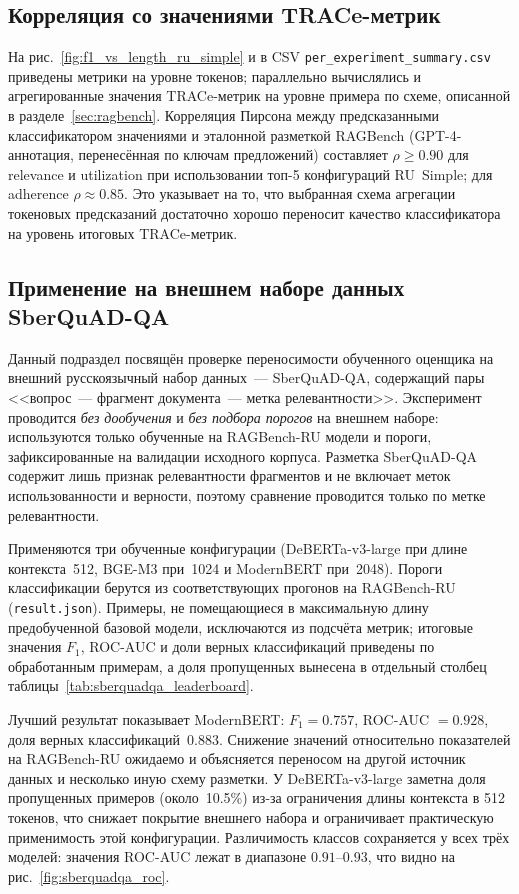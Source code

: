 \subsection{Корреляция со значениями TRACe-метрик}

На рис.~\ref{fig:f1_vs_length_ru_simple} и в CSV \texttt{per\_experiment\_summary.csv}
приведены метрики на уровне токенов; параллельно вычислялись и агрегированные
значения TRACe-метрик на уровне примера по схеме, описанной в разделе~\ref{sec:ragbench}. Корреляция Пирсона между
предсказанными классификатором значениями и эталонной разметкой RAGBench (GPT-4-аннотация, перенесённая по ключам предложений) составляет
$\rho \ge 0.90$ для relevance и utilization при использовании топ-5 конфигураций
RU~Simple; для adherence $\rho \approx 0.85$. Это указывает на то, что выбранная схема
агрегации токеновых предсказаний достаточно хорошо переносит качество классификатора на
уровень итоговых TRACe-метрик.

\subsection{Применение на внешнем наборе данных SberQuAD-QA}
\label{sec:sberquadqa_transfer}

Данный подраздел посвящён проверке переносимости обученного оценщика на
внешний русскоязычный набор данных~--- SberQuAD-QA, содержащий пары
<<вопрос~--- фрагмент документа~--- метка релевантности>>. Эксперимент проводится
\emph{без дообучения} и \emph{без подбора порогов} на внешнем наборе: используются
только обученные на RAGBench-RU модели и пороги, зафиксированные на валидации
исходного корпуса. Разметка SberQuAD-QA содержит лишь признак релевантности
фрагментов и не включает меток использованности и верности, поэтому сравнение
проводится только по метке релевантности.

Применяются три обученные конфигурации (DeBERTa-v3-large при длине контекста~512,
BGE-M3 при~1024 и ModernBERT при~2048). Пороги классификации берутся
из соответствующих прогонов на RAGBench-RU (\texttt{result.json}). Примеры,
не помещающиеся в максимальную длину предобученной базовой модели,
исключаются из подсчёта метрик; итоговые значения $F_1$, ROC-AUC и доли верных
классификаций приведены по обработанным примерам, а доля пропущенных вынесена
в отдельный столбец таблицы~\ref{tab:sberquadqa_leaderboard}.



Лучший результат показывает ModernBERT: $F_1 = 0.757$, ROC-AUC $= 0.928$, доля
верных классификаций~$0.883$. Снижение значений относительно показателей на
RAGBench-RU ожидаемо и объясняется переносом на другой источник данных и
несколько иную схему разметки. У DeBERTa-v3-large заметна доля пропущенных
примеров (около~10.5\%) из-за ограничения длины контекста в 512 токенов, что снижает покрытие внешнего набора и ограничивает практическую применимость этой конфигурации.
Различимость классов сохраняется у всех трёх
моделей: значения ROC-AUC лежат в диапазоне $0.91$--$0.93$, что видно на
рис.~\ref{fig:sberquadqa_roc}.

